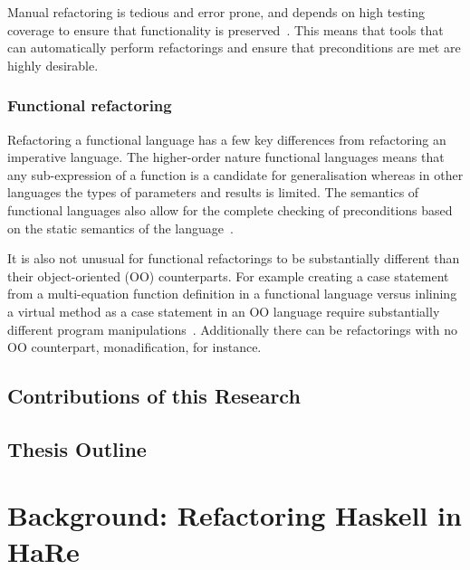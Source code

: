 Manual refactoring is tedious and error prone, and depends on high testing coverage to ensure that functionality is preserved~\citep{fowler}. This means that tools that can automatically perform refactorings and ensure that preconditions are met are highly desirable.

\subsection{Functional refactoring}

Refactoring a functional language has a few key differences from refactoring an imperative language. The higher-order nature functional languages means that any sub-expression of a function is a candidate for generalisation whereas in other languages the types of parameters and results is limited. The semantics of functional languages also allow for the complete checking of preconditions based on the static semantics of the language~\citep{refacTools}.

It is also not unusual for functional refactorings to be substantially different than their object-oriented (OO) counterparts. For example creating a case statement from a multi-equation function definition in a functional language versus inlining a virtual method as a case statement in an OO language require substantially different program manipulations~\citep{huiqingThesis}. Additionally there can be refactorings with no OO counterpart, monadification, for instance.  

\section{Contributions of this Research}


\section{Thesis Outline}



\chapter{Background: Refactoring Haskell in HaRe}
\label{hare}


